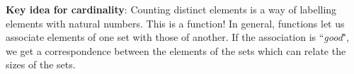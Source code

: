 
{\bf Key idea for cardinality}: Counting 
distinct elements is a way of labelling elements
with natural numbers. This is a function!
In general, functions let us 
associate elements of one set with those
of another. If the association is ``{\it good}", 
we get a correspondence between the elements of the sets
which can relate the sizes of the sets.